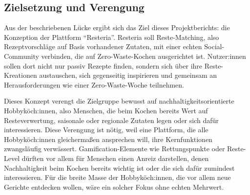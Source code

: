 \subsection{Zielsetzung und Verengung}\label{sec:zielsetzung_und_verengung}

Aus der beschriebenen Lücke ergibt sich das Ziel dieses Projektberichts: die Konzeption der Plattform \enquote{Resteria}. Resteria soll Reste-Matching, also Rezeptvorschläge auf Basis vorhandener Zutaten, mit einer echten Social-Community verbinden, die auf Zero-Waste-Kochen ausgerichtet ist. Nutzer:innen sollen dort nicht nur passiv Rezepte finden, sondern sich über ihre Reste-Kreationen austauschen, sich gegenseitig inspirieren und gemeinsam an Herausforderungen wie einer Zero-Waste-Woche teilnehmen.

Dieses Konzept verengt die Zielgruppe bewusst auf nachhaltigkeitsorientierte Hobbyköch:innen, also Menschen, die beim Kochen bereits Wert auf Resteverwertung, saisonale oder regionale Zutaten legen oder sich dafür interessieren. Diese Verengung ist nötig, weil eine Plattform, die alle Hobbyköch:innen gleichermaßen ansprechen will, ihre Kernfunktionen zwangsläufig verwässert. Gamification-Elemente wie Rettungspunkte oder Reste-Level dürften vor allem für Menschen einen Anreiz darstellen, denen Nachhaltigkeit beim Kochen bereits wichtig ist oder die sich dafür zumindest interessieren. Für die breite Masse der Hobbyköch:innen, die vor allem neue Gerichte entdecken wollen, wäre ein solcher Fokus ohne echten Mehrwert.
